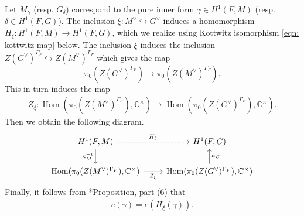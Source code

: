 \documentclass[11pt,letterpaper]{amsart}
\newcommand{\dualgroup}[1]{{#1}^\vee}
\DeclareMathOperator{\Hom}{Hom}
\renewcommand{\1}{\mathbbm{1}}
\numberwithin{equation}{section}
\begin{document}
{Let $M_\gamma$ (resp. $G_\delta$) correspond to the pure inner form $\gamma \in H^1(F,M)$ (resp. $\delta \in H^1(F,G)$). The inclusion $\xi: \dualgroup{M} \hookrightarrow \dualgroup{G}$ induces a homomorphism $H_\xi: H^1(F,M) \xrightarrow{} H^1(F,G) $, which we realize using Kottwitz isomorphism \eqref{eqn: kottwitz map} below. The inclusion $\xi$ induces the inclusion $Z(\dualgroup{G})^{\Gamma_F} \hookrightarrow Z(\dualgroup{M})^{\Gamma_F}$ which gives the map
    \[\pi_0(Z(\dualgroup{G})^{\Gamma_F}) \rightarrow \pi_0(Z(\dualgroup{M})^{\Gamma_F}).\]
    This in turn induces the map 
    \begin{align}\label{eq: Z xi}
        Z_\xi: \Hom(\pi_0(Z(\dualgroup{M})^{\Gamma_F}), \mathbb{C}^\times) \rightarrow \Hom(\pi_0(Z(\dualgroup{G})^{\Gamma_F}), \mathbb{C}^\times).
    \end{align}
    Then we obtain the following diagram.
\begin{equation}\label{equation: definition of h xi}
\begin{tikzcd}
	{H^1(F,M)} & {H^1(F,G)} \\
	{\operatorname{Hom}(\pi_0(Z(\dualgroup{M})^{\Gamma_F}), \mathbb{C}^\times)} & {\operatorname{Hom}(\pi_0(Z(\dualgroup{G})^{\Gamma_F}), \mathbb{C}^\times)}
	\arrow["{H_\xi}", dashed, from=1-1, to=1-2]
	\arrow["{\kappa_M^{-1}}"', from=1-1, to=2-1]
	\arrow["{Z_\xi}"', from=2-1, to=2-2]
	\arrow["{\kappa_G}"', from=2-2, to=1-2]
\end{tikzcd}
\end{equation}
Finally, it follows from \cite{Kot83}*{Proposition, part (6)} that
\begin{align}\label{eqn Kottwitz sign Levi}
    e(\gamma)=e(H_\xi(\gamma)).
\end{align}


}
\end{document}
